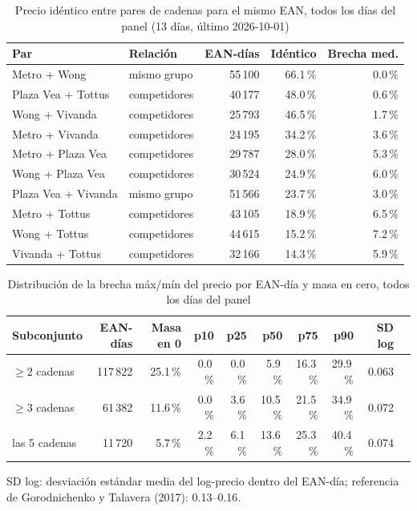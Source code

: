 
\begin{table}[htbp]
\caption{Precio id\'entico entre pares de cadenas para el mismo EAN, todos los d\'ias del panel (13 d\'ias, \'ultimo 2026-10-01)}
\label{tab:identidad}
\centering\scriptsize\setlength{\tabcolsep}{3pt}
\begin{tabular}{@{}llrrr@{}}
\toprule
Par & Relaci\'on & EAN-d\'ias & Id\'entico & Brecha med. \\
\midrule
Metro + Wong & mismo grupo & 55\,100 & 66.1\,\% & 0.0\,\% \\
Plaza Vea + Tottus & competidores & 40\,177 & 48.0\,\% & 0.6\,\% \\
Wong + Vivanda & competidores & 25\,793 & 46.5\,\% & 1.7\,\% \\
Metro + Vivanda & competidores & 24\,195 & 34.2\,\% & 3.6\,\% \\
Metro + Plaza Vea & competidores & 29\,787 & 28.0\,\% & 5.3\,\% \\
Wong + Plaza Vea & competidores & 30\,524 & 24.9\,\% & 6.0\,\% \\
Plaza Vea + Vivanda & mismo grupo & 51\,566 & 23.7\,\% & 3.0\,\% \\
Metro + Tottus & competidores & 43\,105 & 18.9\,\% & 6.5\,\% \\
Wong + Tottus & competidores & 44\,615 & 15.2\,\% & 7.2\,\% \\
Vivanda + Tottus & competidores & 32\,166 & 14.3\,\% & 5.9\,\% \\
\bottomrule\end{tabular}\end{table}

\begin{table}[t]
\caption{Distribuci\'on de la brecha m\'ax/m\'in del precio por EAN-d\'ia y masa en cero, todos los d\'ias del panel}
\label{tab:brecha}
\centering\scriptsize\setlength{\tabcolsep}{4pt}
\begin{tabular}{@{}lrrrrrrrrr@{}}
\toprule
Subconjunto & EAN-d\'ias & Masa en 0 & p10 & p25 & p50 & p75 & p90 & SD log \\
\midrule
$\geq 2$ cadenas & 117\,822 & 25.1\,\% & 0.0\,\% & 0.0\,\% & 5.9\,\% & 16.3\,\% & 29.9\,\% & 0.063 \\
$\geq 3$ cadenas & 61\,382 & 11.6\,\% & 0.0\,\% & 3.6\,\% & 10.5\,\% & 21.5\,\% & 34.9\,\% & 0.072 \\
las 5 cadenas & 11\,720 & 5.7\,\% & 2.2\,\% & 6.1\,\% & 13.6\,\% & 25.3\,\% & 40.4\,\% & 0.074 \\
\bottomrule\end{tabular}
\par\smallskip\raggedright\scriptsize SD log: desviaci\'on est\'andar media del log-precio dentro del EAN-d\'ia; referencia de Gorodnichenko y Talavera (2017): 0.13--0.16.
\end{table}

